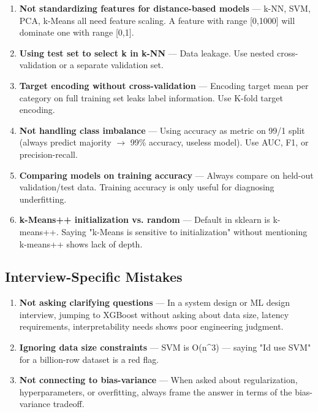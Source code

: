 \documentclass[11pt]{article}
\begin{document}
\begin{enumerate}
\def\labelenumi{\arabic{enumi}.}
\setcounter{enumi}{7}
\item
  \textbf{Not standardizing features for distance-based models} --- k-NN, SVM, PCA, k-Means all need feature scaling. A feature with range {[}0,1000{]} will dominate one with range {[}0,1{]}.
\item
  \textbf{Using test set to select k in k-NN} --- Data leakage. Use nested cross-validation or a separate validation set.
\item
  \textbf{Target encoding without cross-validation} --- Encoding target mean per category on full training set leaks label information. Use K-fold target encoding.
\item
  \textbf{Not handling class imbalance} --- Using accuracy as metric on 99/1 split (always predict majority \(\rightarrow\) 99\% accuracy, useless model). Use AUC, F1, or precision-recall.
\item
  \textbf{Comparing models on training accuracy} --- Always compare on held-out validation/test data. Training accuracy is only useful for diagnosing underfitting.
\item
  \textbf{k-Means++ initialization vs. random} --- Default in sklearn is k-means++. Saying "k-Means is sensitive to initialization" without mentioning k-means++ shows lack of depth.
\end{enumerate}

\subsection{Interview-Specific Mistakes}\label{interview-specific-mistakes}

\begin{enumerate}
\def\labelenumi{\arabic{enumi}.}
\setcounter{enumi}{13}
\item
  \textbf{Not asking clarifying questions} --- In a system design or ML design interview, jumping to XGBoost without asking about data size, latency requirements, interpretability needs shows poor engineering judgment.
\item
  \textbf{Ignoring data size constraints} --- SVM is O(n\^{}3) --- saying "I\textquotesingle d use SVM" for a billion-row dataset is a red flag.
\item
  \textbf{Not connecting to bias-variance} --- When asked about regularization, hyperparameters, or overfitting, always frame the answer in terms of the bias-variance tradeoff.
\end{enumerate}
\end{document}
